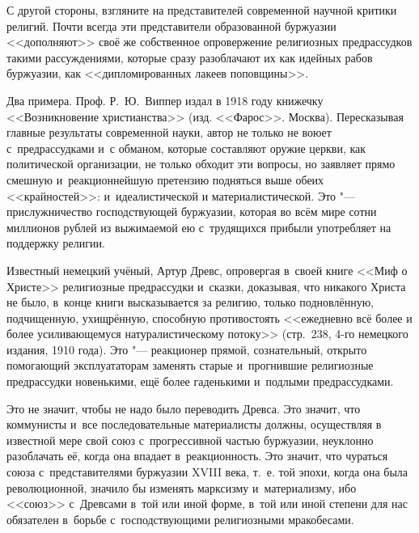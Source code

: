 С другой стороны, взгляните на представителей современной научной критики
религий. Почти всегда эти представители образованной буржуазии <<дополняют>>
своё же собственное опровержение религиозных предрассудков такими
рассуждениями, которые сразу разоблачают их как идейных рабов буржуазии,
как <<дипломированных лакеев поповщины>>.

Два примера. Проф. Р.~Ю.~Виппер издал в 1918 году книжечку <<Возникновение
христианства>> (изд. <<Фарос>>. Москва). Пересказывая главные результаты
современной науки, автор не только не воюет с~предрассудками и~с обманом,
которые составляют оружие церкви, как политической организации, не только
обходит эти вопросы, но заявляет прямо смешную и~реакционнейшую претензию
подняться выше обеих <<крайностей>>: и~идеалистической и
материалистической. Это "--- прислужничество господствующей буржуазии,
которая во всём мире сотни миллионов рублей из выжимаемой ею с~трудящихся
прибыли употребляет на поддержку религии.

Известный немецкий учёный, Артур Древс, опровергая в~своей книге <<Миф о
Христе>> религиозные предрассудки и~сказки, доказывая, что никакого Христа
не было, в~конце книги высказывается за религию, только подновлённую,
подчищенную, ухищрённую, способную противостоять <<ежедневно всё более и
более усиливающемуся натуралистическому потоку>> (стр.~238, 4-го немецкого
издания, 1910 года). Это "--- реакционер прямой, сознательный, открыто
помогающий эксплуататорам заменять старые и~прогнившие религиозные
предрассудки новенькими, ещё более гаденькими и~подлыми предрассудками.

Это не значит, чтобы не надо было переводить Древса. Это значит, что
коммунисты и~все последовательные материалисты должны, осуществляя в
известной мере свой союз с~прогрессивной частью буржуазии, неуклонно
разоблачать её, когда она впадает в~реакционность. Это значит, что чураться
союза с~представителями буржуазии XVIII века, т.~е. той эпохи, когда она
была революционной, значило бы изменять марксизму и~материализму, ибо
<<союз>> с~Древсами в~той или иной форме, в~той или иной степени для нас
обязателен в~борьбе с~господствующими религиозными мракобесами.

